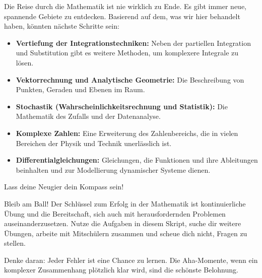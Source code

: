 Die Reise durch die Mathematik ist nie wirklich zu Ende. Es gibt immer neue, spannende Gebiete zu entdecken. Basierend auf dem, was wir hier behandelt haben, könnten nächste Schritte sein:
\begin{itemize}
    \item \textbf{Vertiefung der Integrationstechniken:} Neben der partiellen Integration und Substitution gibt es weitere Methoden, um komplexere Integrale zu lösen.
    \item \textbf{Vektorrechnung und Analytische Geometrie:} Die Beschreibung von Punkten, Geraden und Ebenen im Raum.
    \item \textbf{Stochastik (Wahrscheinlichkeitsrechnung und Statistik):} Die Mathematik des Zufalls und der Datenanalyse.
    \item \textbf{Komplexe Zahlen:} Eine Erweiterung des Zahlenbereichs, die in vielen Bereichen der Physik und Technik unerlässlich ist.
    \item \textbf{Differentialgleichungen:} Gleichungen, die Funktionen und ihre Ableitungen beinhalten und zur Modellierung dynamischer Systeme dienen.
\end{itemize}
Lass deine Neugier dein Kompass sein!

\begin{tippumgebung}{Bleib am Ball!}
Der Schlüssel zum Erfolg in der Mathematik ist kontinuierliche Übung und die Bereitschaft, sich auch mit herausfordernden Problemen auseinanderzusetzen. Nutze die Aufgaben in diesem Skript, suche dir weitere Übungen, arbeite mit Mitschülern zusammen und scheue dich nicht, Fragen zu stellen.

Denke daran: Jeder Fehler ist eine Chance zu lernen. Die Aha-Momente, wenn ein komplexer Zusammenhang plötzlich klar wird, sind die schönste Belohnung. \smiley{}
\end{tippumgebung}

